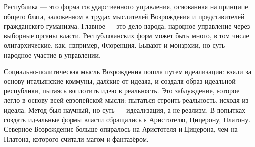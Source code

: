 
Республика --- это форма государственного управления, основанная на принципе общего блага, заложенном в трудах мыслителей Возрождения и представителей гражданского гуманизма. Главное --- это дело народа, народное управление через выборные органы власти. Республиканских форм может быть много, в том числе олигархические, как, например, Флоренция. Бывают и монархии, но суть --- народное участие в управлении.

Социально-политическая мысль Возрождения пошла путем идеализации: взяли за основу итальянские коммуны, далёкие от идеала, и создали образ идеальной республики, пытаясь воплотить идею в реальность. Это заблуждение, которое легло в основу всей европейской мысли: пытаться строить реальность, исходя из идеала. Метод был научный, но суть --- идеализация, а не реализм.
В попытках создать идеальные формы власти обращались к Аристотелю, Цицерону, Платону. Северное Возрождение больше опиралось на Аристотеля и Цицерона, чем на Платона, которого считали магом и фантазёром.

